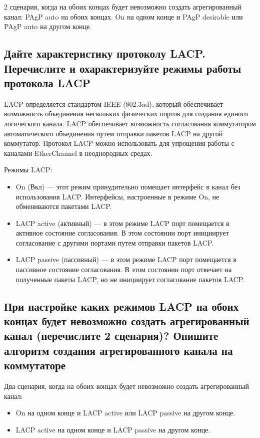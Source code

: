 2 сценария, когда на обоих концах будет невозможно создать 
агрегированный канал:
PAgP auto на обоих концах.
On на одном конце и PAgP desirable или PAgP auto на другом 
конце.

\subsection{Дайте характеристику протоколу LACP. Перечислите и 
охарактеризуйте режимы работы протокола LACP}
LACP определяется стандартом IEEE (802.3ad), который обеспечивает 
возможность объединения нескольких физических портов для создания 
единого логического канала. LACP обеспечивает возможность согласования 
коммутатором автоматического объединения путем отправки пакетов LACP 
на другой коммутатор. Протокол LACP можно использовать для упрощения 
работы с каналами EtherChannel в неоднородных средах.

Режимы LACP:
\begin{itemize}
	\item On (Вкл) — этот режим принудительно помещает интерфейс в 
		канал без использования LACP. Интерфейсы, настроенные в 
		режиме On, не обмениваются пакетами LACP.
	\item LACP active (активный) --- в этом режиме LACP порт 
		помещается в активное состояние согласования. В этом состоянии 
		порт инициирует согласование с другими портами путем отправки 
		пакетов LACP.
	\item LACP passive (пассивный) --- в этом режиме LACP порт 
		помещается в пассивное состояние согласования. В этом состоянии 
		порт отвечает на полученные пакеты LACP, но не инициирует 
		согласование пакетов LACP.
\end{itemize}

\subsection{При настройке каких режимов LACP на обоих концах будет 
невозможно создать агрегированный канал (перечислите 2 
сценария)? Опишите алгоритм создания агрегированного 
канала на коммутаторе}
Два сценария, когда на обоих концах будет невозможно создать 
агрегированный канал:
\begin{itemize}
	\item On на одном конце и LACP active или LACP passive на другом конце.
	\item LACP active на одном конце и LACP passive на другом конце.
\end{itemize}


